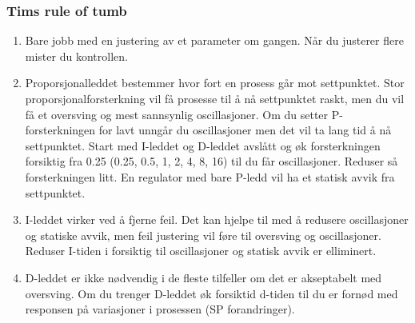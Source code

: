 \documentclass[10pt,a5paper]{article}
\begin{document}
\subsubsection{Tims rule of tumb}
\begin{enumerate}
	\item Bare jobb med en justering av et parameter om gangen. Når du justerer flere mister du kontrollen. 
	\item Proporsjonalleddet bestemmer hvor fort en prosess går mot settpunktet. Stor proporsjonalforsterkning vil få prosesse til å nå settpunktet raskt, men du vil få et oversving og mest sannsynlig oscillasjoner. Om du setter P-forsterkningen for lavt unngår du oscillasjoner men det vil ta lang tid å nå settpunktet. Start med I-leddet og D-leddet avslått og øk forsterkningen forsiktig  fra 0.25 (0.25, 0.5, 1, 2, 4, 8, 16) til du får oscillasjoner. Reduser så forsterkningen litt. En regulator med bare P-ledd vil ha et statisk avvik fra settpunktet. 
	\item I-leddet virker ved å fjerne feil. Det kan hjelpe til med å redusere oscillasjoner og statiske avvik, men feil justering vil føre til oversving og oscillasjoner. Reduser I-tiden i forsiktig til oscillasjoner og statisk avvik er elliminert. 
	\item D-leddet er ikke nødvendig i de fleste tilfeller om det er akseptabelt med oversving. Om du trenger D-leddet øk forsiktid d-tiden til du er fornød med responsen på variasjoner i prosessen  (SP forandringer).
\end{enumerate}
\end{document}
